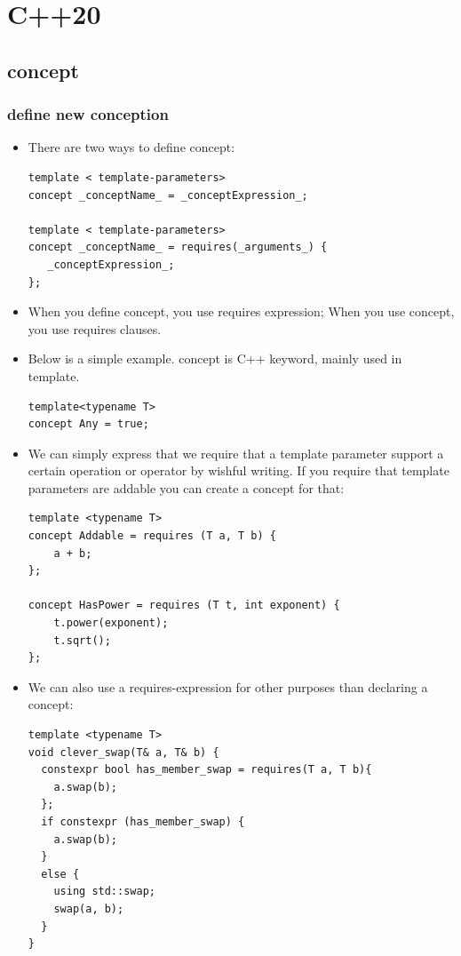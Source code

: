 \documentclass[a4paper,11pt,twoside]{book}
\begin{document}
\section{C++20}

\subsection{concept}

\subsubsection{define new conception}
\begin{itemize}
    \item There are two ways to define concept:
\begin{lstlisting}
template < template-parameters>
concept _conceptName_ = _conceptExpression_;

template < template-parameters>
concept _conceptName_ = requires(_arguments_) {
   _conceptExpression_;
};
\end{lstlisting}

    \item When you define concept, you use requires expression; When you use concept, you use requires clauses.

	\item Below is a simple example. concept is C++ keyword, mainly used in template.

\begin{lstlisting}
template<typename T> 
concept Any = true;
\end{lstlisting}

    \item We can simply express that we require that a template parameter support a certain operation or operator by wishful writing. If you require that template parameters are addable you can create a concept for that:

\begin{lstlisting}
template <typename T>
concept Addable = requires (T a, T b) {
	a + b; 
};

concept HasPower = requires (T t, int exponent) {
	t.power(exponent);
	t.sqrt();
};
\end{lstlisting}

    \item We can also use a requires-expression for other purposes than declaring a concept:

\begin{lstlisting}
template <typename T>
void clever_swap(T& a, T& b) {
  constexpr bool has_member_swap = requires(T a, T b){ 
    a.swap(b); 
  };
  if constexpr (has_member_swap) {
    a.swap(b);
  }
  else {
    using std::swap;
    swap(a, b);
  }
}
\end{lstlisting}


\end{itemize}
\end{document}
